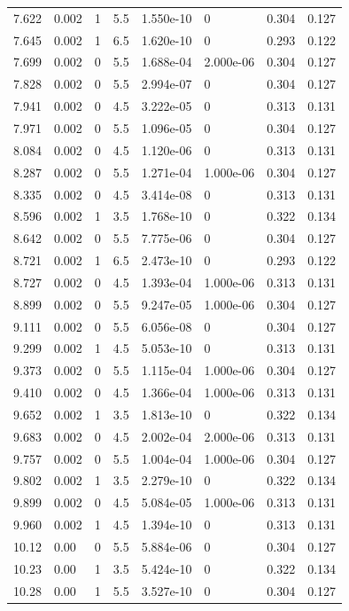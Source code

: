 \documentclass[preview]{standalone}
\begin{document}
{{{\begin{tabular}{L{1.2cm}C{1.2cm} C{0.3cm}C{0.5cm} C{1.4cm}C{1.4cm} C{1.4cm}C{1.4cm}}
  7.622  &  0.002  & 1     & 5.5 &  1.550e-10  & 0  & 0.304 &  0.127   \\ 
  7.645  &  0.002  & 1     & 6.5 &  1.620e-10  & 0  & 0.293 &  0.122   \\ 
  7.699  &  0.002  & 0     & 5.5 &  1.688e-04  & 2.000e-06  & 0.304 &  0.127   \\ 
  7.828  &  0.002  & 0     & 5.5 &  2.994e-07  & 0  & 0.304 &  0.127   \\ 
  7.941  &  0.002  & 0     & 4.5 &  3.222e-05  & 0  & 0.313 &  0.131   \\ 
  7.971  &  0.002  & 0     & 5.5 &  1.096e-05  & 0  & 0.304 &  0.127   \\ 
  8.084  &  0.002  & 0     & 4.5 &  1.120e-06  & 0  & 0.313 &  0.131   \\ 
  8.287  &  0.002  & 0     & 5.5 &  1.271e-04  & 1.000e-06  & 0.304 &  0.127   \\ 
  8.335  &  0.002  & 0     & 4.5 &  3.414e-08  & 0  & 0.313 &  0.131   \\ 
  8.596  &  0.002  & 1     & 3.5 &  1.768e-10  & 0  & 0.322 &  0.134   \\ 
  8.642  &  0.002  & 0     & 5.5 &  7.775e-06  & 0  & 0.304 &  0.127   \\ 
  8.721  &  0.002  & 1     & 6.5 &  2.473e-10  & 0  & 0.293 &  0.122   \\ 
  8.727  &  0.002  & 0     & 4.5 &  1.393e-04  & 1.000e-06  & 0.313 &  0.131   \\ 
  8.899  &  0.002  & 0     & 5.5 &  9.247e-05  & 1.000e-06  & 0.304 &  0.127   \\ 
  9.111  &  0.002  & 0     & 5.5 &  6.056e-08  & 0  & 0.304 &  0.127   \\ 
  9.299  &  0.002  & 1     & 4.5 &  5.053e-10  & 0  & 0.313 &  0.131   \\ 
  9.373  &  0.002  & 0     & 5.5 &  1.115e-04  & 1.000e-06  & 0.304 &  0.127   \\ 
  9.410  &  0.002  & 0     & 4.5 &  1.366e-04  & 1.000e-06  & 0.313 &  0.131   \\ 
  9.652  &  0.002  & 1     & 3.5 &  1.813e-10  & 0  & 0.322 &  0.134   \\ 
  9.683  &  0.002  & 0     & 4.5 &  2.002e-04  & 2.000e-06  & 0.313 &  0.131   \\ 
  9.757  &  0.002  & 0     & 5.5 &  1.004e-04  & 1.000e-06  & 0.304 &  0.127   \\ 
  9.802  &  0.002  & 1     & 3.5 &  2.279e-10  & 0  & 0.322 &  0.134   \\ 
  9.899  &  0.002  & 0     & 4.5 &  5.084e-05  & 1.000e-06  & 0.313 &  0.131   \\ 
  9.960  &  0.002  & 1     & 4.5 &  1.394e-10  & 0  & 0.313 &  0.131   \\ 
  10.12  &  0.00  & 0     & 5.5 &  5.884e-06  & 0  & 0.304 &  0.127   \\ 
  10.23  &  0.00  & 1     & 3.5 &  5.424e-10  & 0  & 0.322 &  0.134   \\ 
  10.28  &  0.00  & 1     & 5.5 &  3.527e-10  & 0  & 0.304 &  0.127   \\ 
\hline 
\end{tabular} 

}}}
\end{document}
